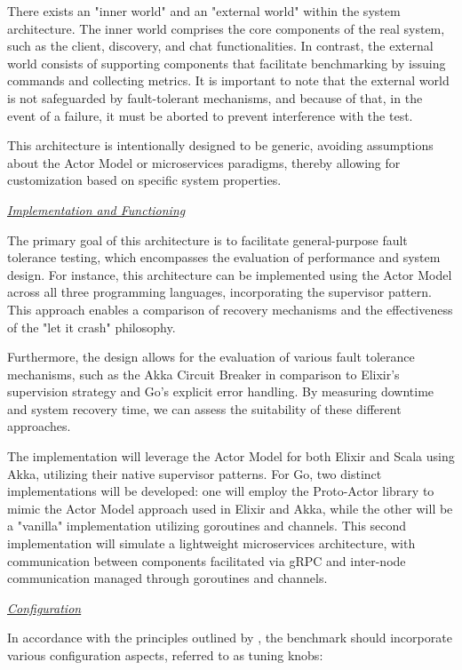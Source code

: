 There exists an "inner world" and an "external world" within the system architecture. The inner world comprises the core components of the real system, such as the client, discovery, and chat functionalities. In contrast, the external world consists of supporting components that facilitate benchmarking by issuing commands and collecting metrics. It is important to note that the external world is not safeguarded by fault-tolerant mechanisms, and because of that, in the event of a failure, it must be aborted to prevent interference with the test.

This architecture is intentionally designed to be generic, avoiding assumptions about the Actor Model or microservices paradigms, thereby allowing for customization based on specific system properties.

\textit{\underline{Implementation and Functioning}}

The primary goal of this architecture is to facilitate general-purpose fault tolerance testing, which encompasses the evaluation of performance and system design. For instance, this architecture can be implemented using the Actor Model across all three programming languages, incorporating the supervisor pattern. This approach enables a comparison of recovery mechanisms and the effectiveness of the "let it crash" philosophy.

Furthermore, the design allows for the evaluation of various fault tolerance mechanisms, such as the Akka Circuit Breaker in comparison to Elixir’s supervision strategy and Go's explicit error handling. By measuring downtime and system recovery time, we can assess the suitability of these different approaches.

The implementation will leverage the Actor Model for both Elixir and Scala using Akka, utilizing their native supervisor patterns. For Go, two distinct implementations will be developed: one will employ the Proto-Actor library to mimic the Actor Model approach used in Elixir and Akka, while the other will be a "vanilla" implementation utilizing goroutines and channels. This second implementation will simulate a lightweight microservices architecture, with communication between components facilitated via \gls{gRPC} and inter-node communication managed through goroutines and channels.

\textit{\underline{Configuration}}

In accordance with the principles outlined by \textcite{Randtoul2022}, the benchmark should incorporate various configuration aspects, referred to as tuning knobs:

